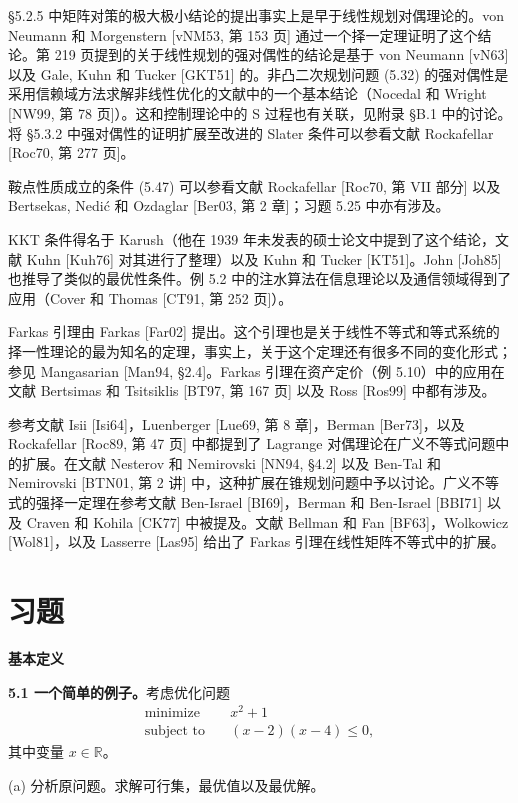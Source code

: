 \documentclass[UTF8,12pt,a4paper,fontset=fandol]{ctexart}
\begin{document}
§5.2.5 中矩阵对策的极大极小结论的提出事实上是早于线性规划对偶理论的。von Neumann 和 Morgenstern [vNM53, 第 153 页] 通过一个择一定理证明了这个结论。第 219 页提到的关于线性规划的强对偶性的结论是基于 von Neumann [vN63] 以及 Gale, Kuhn 和 Tucker [GKT51] 的。非凸二次规划问题 (5.32) 的强对偶性是采用信赖域方法求解非线性优化的文献中的一个基本结论（Nocedal 和 Wright [NW99, 第 78 页]）。这和控制理论中的 S 过程也有关联，见附录 §B.1 中的讨论。将 §5.3.2 中强对偶性的证明扩展至改进的 Slater 条件可以参看文献 Rockafellar [Roc70, 第 277 页]。

鞍点性质成立的条件 (5.47) 可以参看文献 Rockafellar [Roc70, 第 VII 部分] 以及 Bertsekas, Nedić 和 Ozdaglar [Ber03, 第 2 章]；习题 5.25 中亦有涉及。

KKT 条件得名于 Karush（他在 1939 年未发表的硕士论文中提到了这个结论，文献 Kuhn [Kuh76] 对其进行了整理）以及 Kuhn 和 Tucker [KT51]。John [Joh85] 也推导了类似的最优性条件。例 5.2 中的注水算法在信息理论以及通信领域得到了应用（Cover 和 Thomas [CT91, 第 252 页]）。

Farkas 引理由 Farkas [Far02] 提出。这个引理也是关于线性不等式和等式系统的择一性理论的最为知名的定理，事实上，关于这个定理还有很多不同的变化形式；参见 Mangasarian [Man94, §2.4]。Farkas 引理在资产定价（例 5.10）中的应用在文献 Bertsimas 和 Tsitsiklis [BT97, 第 167 页] 以及 Ross [Ros99] 中都有涉及。

参考文献 Isii [Isi64]，Luenberger [Lue69, 第 8 章]，Berman [Ber73]，以及 Rockafellar [Roc89, 第 47 页] 中都提到了 Lagrange 对偶理论在广义不等式问题中的扩展。在文献 Nesterov 和 Nemirovski [NN94, §4.2] 以及 Ben-Tal 和 Nemirovski [BTN01, 第 2 讲] 中，这种扩展在锥规划问题中予以讨论。广义不等式的强择一定理在参考文献 Ben-Israel [BI69]，Berman 和 Ben-Israel [BBI71] 以及 Craven 和 Kohila [CK77] 中被提及。文献 Bellman 和 Fan [BF63]，Wolkowicz [Wol81]，以及 Lasserre [Las95] 给出了 Farkas 引理在线性矩阵不等式中的扩展。

\section*{习题}

\noindent\textbf{基本定义}

\noindent\textbf{5.1 一个简单的例子。}\quad 考虑优化问题
\[
\begin{aligned}
\text{minimize}\quad & x^2+1\\
\text{subject to}\quad & (x-2)(x-4)\leq 0,
\end{aligned}
\]
其中变量 $x\in\mathbb{R}$。

(a) 分析原问题。求解可行集，最优值以及最优解。
\end{document}

